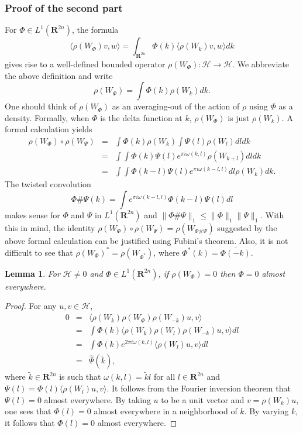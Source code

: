 \documentclass[11pt]{amsart}
\numberwithin{equation}{section}
\theoremstyle{plain}
\newtheorem{lemma}[theorem]{Lemma}
\theoremstyle{definition}
\newcommand{\Hilb}{\mathcal H}
\newcommand{\R}{\mathbf R}
\begin{document}
\subsubsection*{Proof of the second part}
For $\Phi\in L^1(\R^{2n})$, the formula
\begin{equation*}
  \langle \rho(W_\Phi)v,w\rangle =\int_{\R^{2n}} \Phi(k)\langle \rho(W_k) v,w\rangle d k
\end{equation*}
gives rise to a well-defined bounded operator $\rho(W_\Phi):\Hilb\to \Hilb$.
We abbreviate the above definition and write
\begin{equation}
  \label{eq:3}
  \rho(W_\Phi)=\int \Phi(k)\rho(W_k) d k.
\end{equation}
One should think of $\rho(W_\Phi)$ as an averaging-out of the action of $\rho$ using $\Phi$ as a density.
Formally, when $\Phi$ is the delta function at $k$, $\rho(W_\Phi)$ is just $\rho(W_k)$.
A formal calculation yields
\begin{eqnarray*}
  \rho(W_\Phi)\circ \rho(W_\Psi) & = & \int \Phi(k)\rho(W_k) \int \Psi(l)\rho(W_l) d l d k\\
  & = & \int \int \Phi(k)\Psi(l)e^{\pi i \omega(k,l)}\rho(W_{k+l}) d l d k\\
  & = & \int \int \Phi(k-l)\Psi(l)e^{\pi i \omega(k-l,l)}d l \rho(W_k)d k.
\end{eqnarray*}
The twisted convolution
\begin{equation*}
  \Phi\#\Psi(k)=\int e^{\pi i \omega(k-l,l)}\Phi(k-l)\Psi(l)d l
\end{equation*}
makes sense for $\Phi$ and $\Psi$ in $L^1(\R^{2n})$ and $\|\Phi\#\Psi\|_1\leq \|\Phi\|_1\|\Psi\|_1$.
With this in mind, the identity $\rho(W_\Phi)\circ \rho(W_\Psi)=\rho(W_{\Phi\#\Psi})$ suggested by the above formal calculation can be justified using Fubini's theorem.
Also, it is not difficult to see that $\rho(W_{\Phi})^*=\rho(W_{\Phi^*})$, where $\Phi^*(k)=\overline{\Phi(-k)}$.
\begin{lemma}
  \label{lemma:faithful}
  For $\Hilb\neq 0$ and $\Phi\in L^1(\R^{2n})$, if  $\rho(W_\Phi)=0$ then $\Phi=0$ almost everywhere. 
\end{lemma}
\begin{proof}
  For any $u,v\in \Hilb$,
  \begin{eqnarray*}
    0 & = & \langle \rho(W_k)\rho(W_\Phi)\rho(W_{-k})u,v\rangle\\
    & = & \int \Phi(k)\langle \rho(W_k)\rho(W_l)\rho(W_{-k})u,v\rangle d l\\
    & = & \int \Phi(k)e^{2\pi i \omega(k,l)} \langle \rho(W_l)u,v\rangle d l\\
    & = & \hat \Psi(\tilde k),
  \end{eqnarray*}
  where $\tilde k\in \R^{2n}$ is such that $\omega(k,l)=\tilde k l$ for all $l\in \R^{2n}$ and $\Psi(l)=\Phi(l)\langle \rho(W_l)u,v\rangle$.
  It follows from the Fourier inversion theorem that $\Psi(l)=0$ almost everywhere.
  By taking $u$ to be a unit vector and $v=\rho(W_k)u$, one sees that $\Phi(l)=0$ almost everywhere in a neighborhood of $k$.
  By varying $k$, it follows that $\Phi(l)=0$ almost everywhere.
\end{proof}
\end{document}
